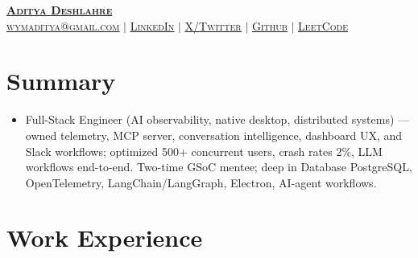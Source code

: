\documentclass[letterpaper,10pt]{article}
\newcommand{\resumeItem}[1]{
  \item\small{
    {#1 \vspace{-3pt}}
  }
}
\newcommand{\resumeSubHeadingListStart}{\begin{itemize}[leftmargin=0.15in, label={}]}
\newcommand{\resumeSubHeadingListEnd}{\end{itemize}}
\begin{document}

\begin{center}
    \scshape\textbf{\Large \href{https://aditya.ovh/}{Aditya Deshlahre}} \\ \vspace{1pt}
    \small \href{mailto:wymaditya@gmail.com}{{\underline{wymaditya@gmail.com}}} $|$ 
    \href{https://www.linkedin.com/in/adityadeshlahre/}{{\underline{LinkedIn}}} $|$
    \href{https://x.com/adityadeshlahre}
    {{\underline{X/Twitter}}} $|$
    \href{https://github.com/adityadeshlahre}{{\underline{Github}}} $|$
    \href{https://leetcode.com/u/adityadeshlahre/}{{\underline{LeetCode}}}
\end{center}




\section{Summary}
  \resumeSubHeadingListStart
    \resumeItem{Full-Stack Engineer (AI observability, native desktop, distributed systems) — owned telemetry, MCP server, conversation intelligence, dashboard UX, and Slack workflows; optimized 500+ concurrent users, crash rates 2\%, LLM workflows end-to-end. Two-time GSoC mentee; deep in Database PostgreSQL, OpenTelemetry, LangChain/LangGraph, Electron, AI-agent workflows.}
  \resumeSubHeadingListEnd


\section{Work Experience}
\end{document}
